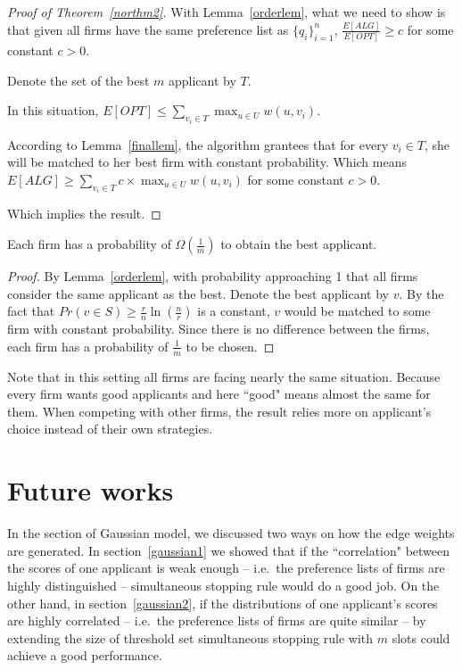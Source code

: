 \begin{proof}[Proof of Theorem~\ref{northm2}]
    With Lemma~\ref{orderlem}, what we need to show is that
    given all firms have the same preference list as $\{q_i\}_{i=1}^{n}$,
    $\frac{E[ALG]}{E[OPT]} \ge c$ for some constant $c > 0$.

    Denote the set of the best $m$ applicant by $T$.

    In this situation, $E[OPT] \le \sum_{v_i \in T} \max_{u \in U} w(u, v_i)$.

    According to Lemma~\ref{finallem}, the algorithm grantees that for every $v_i \in T$,
    she will be matched to her best firm with constant probability.
    Which means $E[ALG] \ge \sum_{v_i \in T} c \times \max_{u \in U} w(u, v_i)$ for some constant $c > 0$.

    Which implies the result.
\end{proof}

\begin{corollary}
    Each firm has a probability of $\Omega(\frac{1}{m})$ to obtain
    the best applicant.
\end{corollary}

\begin{proof}
By Lemma~\ref{orderlem}, with probability approaching 1 that all firms consider the same applicant as the best.
Denote the best applicant by $v$. By the fact that $Pr(v \in S) \ge \frac{r}{n} \ln(\frac{n}{r})$ is a constant,
$v$ would be matched to some firm with constant probability.
Since there is no difference between the firms, each firm has a probability of $\frac{1}{m}$ to be chosen.
\end{proof}

Note that in this setting all firms are facing nearly the same situation.
Because every firm wants good applicants and here ``good" means
almost the same for them.
When competing with other firms, the result relies more on applicant's
choice instead of their own strategies.

\section{Future works}

In the section of Gaussian model, we discussed two ways on how the edge
weights are generated. 
In section~\ref{gaussian1} we showed that if the ``correlation" between
the scores of one applicant is weak enough -- i.e.\ the preference lists of
firms are highly distinguished -- simultaneous stopping rule
would do a good job. On the other hand, in section~\ref{gaussian2}, if
the distributions of one applicant's scores are highly correlated --
i.e.\ the preference lists of firms are quite similar -- by extending 
the size of threshold set simultaneous stopping rule with $m$
slots could achieve a good performance.

